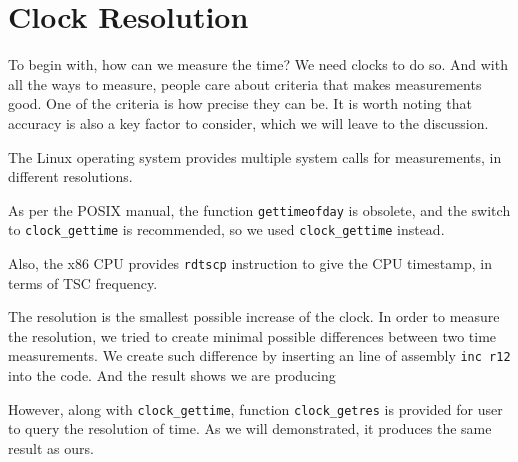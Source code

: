 \section{Clock Resolution}

To begin with, how can we measure the time? We need clocks to do so. And with all the ways to measure, people care about criteria that makes measurements good. One of the criteria is how precise they can be. It is worth noting that accuracy is also a key factor to consider, which we will leave to the discussion.

The Linux operating system provides multiple system calls for measurements, in different resolutions.

As per the POSIX manual\cite{posix_clock_gettime}, the function \texttt{gettimeofday} is obsolete, and the switch to \texttt{clock\_gettime} is recommended, so we used \texttt{clock\_gettime} instead.

Also, the x86 CPU provides \texttt{rdtscp} instruction to give the CPU timestamp, in terms of TSC frequency.

The resolution is the smallest possible increase of the clock. In order to measure the resolution, we tried to create minimal possible differences between two time measurements. We create such difference by inserting an line of assembly \texttt{inc r12} into the code. And the result shows we are producing

However, along with \texttt{clock\_gettime}, function \texttt{clock\_getres} is provided for user to query the resolution of time. As we will demonstrated, it produces the same result as ours.